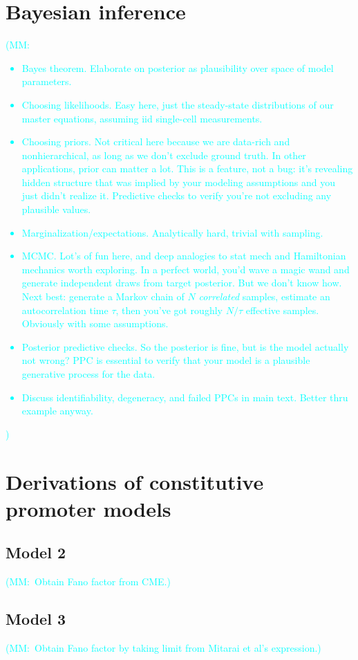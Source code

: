 \documentclass[12pt]{article}%
\newcommand{\mmnote}[1]{\textcolor{cyan}{(MM:~#1)}}
\begin{document}
\section{Bayesian inference}
\mmnote{
\begin{itemize}
\item Bayes theorem.
Elaborate on posterior as plausibility over
space of model parameters.
\item Choosing likelihoods.
Easy here, just the steady-state distributions of our master
equations, assuming iid single-cell measurements.
\item Choosing priors.
Not critical here because we are data-rich and nonhierarchical,
as long as we don't exclude ground truth. In other applications,
prior can matter a lot. This is a feature, not a bug: it's
revealing hidden structure that was implied by your modeling
assumptions and you just didn't realize it. Predictive checks to
verify you're not excluding any plausible values.
\item Marginalization/expectations.
Analytically hard, trivial with sampling.
\item MCMC.
Lot's of fun here, and deep analogies to stat mech and
Hamiltonian mechanics worth exploring. In a perfect world, you'd
wave a magic wand and generate independent draws from target
posterior. But we don't know how. Next best: generate a Markov
chain of $N$ \textit{correlated} samples, estimate an
autocorrelation time $\tau$, then you've got roughly $N/\tau$
effective samples. Obviously with some assumptions.
\item Posterior predictive checks.
So the posterior is fine, but is the model actually not wrong?
PPC is essential to verify that your model is a plausible
generative process for the data.
\item Discuss identifiability, degeneracy, and failed PPCs in main text. Better thru example anyway.
\end{itemize}
}

\section{Derivations of constitutive promoter models}
\subsection{Model 2}
\mmnote{Obtain Fano factor from CME.}
\subsection{Model 3}
\mmnote{Obtain Fano factor by taking limit from Mitarai et al's expression.}
\end{document}
